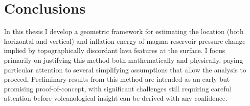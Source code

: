 \chapter{Conclusions}

In this thesis I develop a geometric framework for estimating the location (both horizontal and vertical) and inflation energy of magma reservoir pressure change implied by topographically discordant lava features at the surface. I focus primarily on justifying this method both mathematically and physically, paying particular attention to several simplifying assumptions that allow the analysis to proceed. Preliminary results from this method are intended as an early but promising proof-of-concept, with significant challenges still requiring careful attention before volcanological insight can be derived with any confidence.